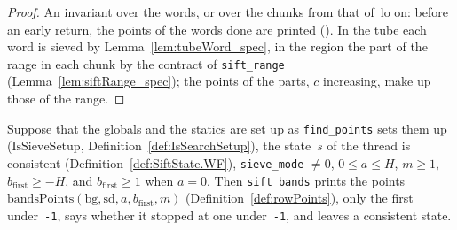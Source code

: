 \begin{proof}
  \leanok
  An invariant over the words, or over the chunks from that of~$\mathrm{lo}$ on: before an early
  return, the points of the words done are printed (). In the tube
  each word is sieved by Lemma~\ref{lem:tubeWord_spec}, in the region the part of the range in each
  chunk by the contract of \texttt{sift\_range} (Lemma~\ref{lem:siftRange_spec}); the points of the
  parts, $c$ increasing, make up those of the range.
\end{proof}

\begin{lemma}\label{lem:siftBands_spec}
  \leanok
  Suppose that the globals and the statics are set up as \texttt{find\_points} sets them up
  ($\mathrm{IsSieveSetup}$, Definition~\ref{def:IsSearchSetup}), the state~$s$ of the thread is
  consistent (Definition~\ref{def:SiftState.WF}), \texttt{sieve\_mode} $\ne 0$, $0 \le a \le H$,
  $m \ge 1$, $b_{\mathrm{first}} \ge -H$, and $b_{\mathrm{first}} \ge 1$ when $a = 0$. Then
  \texttt{sift\_bands} prints the points $\mathrm{bandsPoints}(\mathrm{bg}, \mathrm{sd}, a,
  b_{\mathrm{first}}, m)$ (Definition~\ref{def:rowPoints}), only the first under~\texttt{-1}, says
  whether it stopped at one under~\texttt{-1}, and leaves a consistent state.
\end{lemma}

